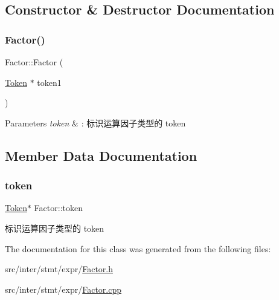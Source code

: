 \subsection{Constructor \& Destructor Documentation}
\mbox{\label{class_factor_af17f55c01064dcb353c47243931d095a}} 
\subsubsection{\texorpdfstring{Factor()}{Factor()}}
{\footnotesize\ttfamily Factor\+::\+Factor (\begin{DoxyParamCaption}\item[{\hyperlink{class_token}{Token} $\ast$}]{token1 }\end{DoxyParamCaption})}


\begin{DoxyParams}{Parameters}
{\em token} & \+: 标识运算因子类型的 token \\
\hline
\end{DoxyParams}


\subsection{Member Data Documentation}
\mbox{\label{class_factor_ab2c56fe952c0e3dad6006950e166495b}} 
\subsubsection{\texorpdfstring{token}{token}}
{\footnotesize\ttfamily \hyperlink{class_token}{Token}$\ast$ Factor\+::token}

标识运算因子类型的 token 

The documentation for this class was generated from the following files\+:\begin{DoxyCompactItemize}
\item 
src/inter/stmt/expr/\hyperlink{_factor_8h}{Factor.\+h}\item 
src/inter/stmt/expr/\hyperlink{_factor_8cpp}{Factor.\+cpp}\end{DoxyCompactItemize}
